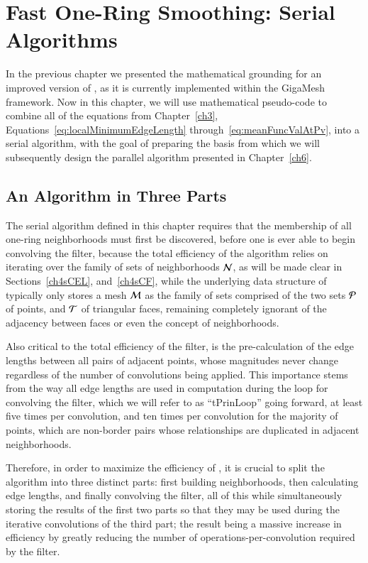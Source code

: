 \chapter{Fast One-Ring Smoothing: Serial Algorithms}
\label{ch4}
In the previous chapter we presented the mathematical grounding for an improved version of , as it is currently implemented within the GigaMesh framework. Now in this chapter, we will use mathematical pseudo-code to combine all of the equations from Chapter~\ref{ch3}, Equations~\ref{eq:localMinimumEdgeLength} through~\ref{eq:meanFuncValAtPv}, into a serial algorithm, with the goal of preparing the basis from which we will subsequently design the parallel algorithm presented in Chapter~\ref{ch6}.

%
%
%
%
%
%
\section{An Algorithm in Three Parts}
\label{ch4sATP}
The serial algorithm defined in this chapter requires that the membership of all one-ring neighborhoods must first be discovered, before one is ever able to begin convolving the filter, because the total efficiency of the algorithm relies on iterating over the family of sets of neighborhoods $\mathcal{N}$, as will be made clear in Sections~\ref{ch4sCEL}, and~\ref{ch4sCF}, while the underlying data structure of \tdd{} typically only stores a mesh $\mathcal{M}$ as the family of sets comprised of the two sets $\mathcal{P}$ of points, and $\mathcal{T}$ of triangular faces, remaining completely ignorant of the \gls{adjacency} between faces or even the concept of neighborhoods.

Also critical to the total efficiency of the filter, is the pre-calculation of the edge lengths between all pairs of adjacent points, whose magnitudes never change regardless of the number of convolutions being applied. This importance stems from the way all edge lengths are used in computation during the loop for convolving the filter, which we will refer to as ``\gls{tPrinLoop}'' going forward, at least five times per convolution, and ten times per convolution for the majority of points, which are non-border pairs whose relationships are duplicated in \gls{adjacent} neighborhoods.

Therefore, in order to maximize the efficiency of , it is crucial to split the algorithm into three distinct parts: first building neighborhoods, then calculating edge lengths, and finally convolving the filter, all of this while simultaneously storing the results of the first two parts so that they may be used during the iterative convolutions of the third part; the result being a massive increase in efficiency by greatly reducing the number of operations-per-convolution required by the filter.

